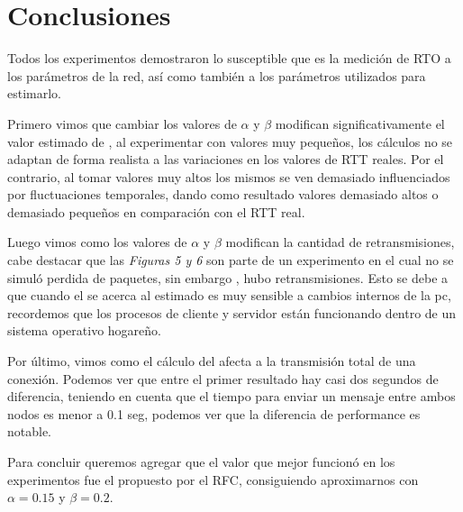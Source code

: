 \section{Conclusiones}

Todos los experimentos demostraron lo susceptible que es la medici\'on de
RTO a los par\'ametros de la red, as\'i como tambi\'en a los par\'ametros
utilizados para estimarlo. 

Primero vimos que cambiar los valores de $\alpha$ y $\beta$ modifican
significativamente el valor estimado de \rto{}, al experimentar con valores
muy peque\~nos, los cálculos no se adaptan de forma realista a las
variaciones en los valores de RTT reales. Por el contrario, al tomar
valores muy altos los mismos se ven demasiado influenciados por
fluctuaciones temporales, dando como resultado valores demasiado altos o
demasiado peque\~nos en comparación con el RTT real. 

Luego vimos como los valores de $\alpha$ y $\beta$ modifican la cantidad
de retransmisiones, cabe destacar que las \textit{Figuras 5 y 6} son parte
de un experimento en el cual no se simul\'o perdida de paquetes, sin embargo
, hubo retransmisiones. Esto se debe a que cuando el \rto{} se acerca al 
\rtt{} estimado es muy sensible a cambios internos de la pc, recordemos que
los procesos de cliente y servidor est\'an funcionando dentro de un sistema
operativo hogareño. 

Por \'ultimo, vimos como el c\'alculo del \rto{} afecta a la transmisi\'on
total de una conexi\'on. Podemos ver que entre el primer resultado hay casi
dos segundos de diferencia, teniendo en cuenta que el tiempo para enviar un 
mensaje entre ambos nodos es menor a 0.1 seg, podemos ver que la diferencia
de performance es notable.

Para concluir queremos agregar que el valor que mejor funcion\'o en los 
experimentos fue el propuesto por el RFC, consiguiendo aproximarnos con $\alpha=0.15$ y $\beta=0.2$. 
